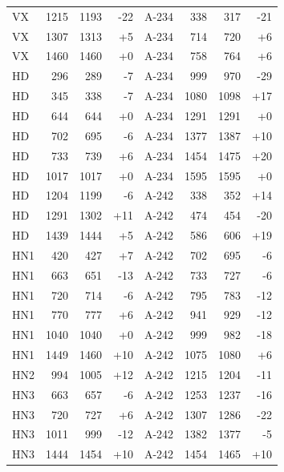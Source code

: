 \begin{table}[p]
{\begin{tabular}{lrrr@{\hskip 2em}lrrr}
VX & 1215 & 1193 & -22 & A-234 & 338 & 317 & -21 \\
VX & 1307 & 1313 & +5 & A-234 & 714 & 720 & +6 \\
VX & 1460 & 1460 & +0 & A-234 & 758 & 764 & +6 \\
HD & 296 & 289 & -7 & A-234 & 999 & 970 & -29 \\
HD & 345 & 338 & -7 & A-234 & 1080 & 1098 & +17 \\
HD & 644 & 644 & +0 & A-234 & 1291 & 1291 & +0 \\
HD & 702 & 695 & -6 & A-234 & 1377 & 1387 & +10 \\
HD & 733 & 739 & +6 & A-234 & 1454 & 1475 & +20 \\
HD & 1017 & 1017 & +0 & A-234 & 1595 & 1595 & +0 \\
HD & 1204 & 1199 & -6 & A-242 & 338 & 352 & +14 \\
HD & 1291 & 1302 & +11 & A-242 & 474 & 454 & -20 \\
HD & 1439 & 1444 & +5 & A-242 & 586 & 606 & +19 \\
HN1 & 420 & 427 & +7 & A-242 & 702 & 695 & -6 \\
HN1 & 663 & 651 & -13 & A-242 & 733 & 727 & -6 \\
HN1 & 720 & 714 & -6 & A-242 & 795 & 783 & -12 \\
HN1 & 770 & 777 & +6 & A-242 & 941 & 929 & -12 \\
HN1 & 1040 & 1040 & +0 & A-242 & 999 & 982 & -18 \\
HN1 & 1449 & 1460 & +10 & A-242 & 1075 & 1080 & +6 \\
HN2 & 994 & 1005 & +12 & A-242 & 1215 & 1204 & -11 \\
HN3 & 663 & 657 & -6 & A-242 & 1253 & 1237 & -16 \\
HN3 & 720 & 727 & +6 & A-242 & 1307 & 1286 & -22 \\
HN3 & 1011 & 999 & -12 & A-242 & 1382 & 1377 & -5 \\
HN3 & 1444 & 1454 & +10 & A-242 & 1454 & 1465 & +10 \\
\bottomrule
\end{tabular}
}
\end{table}
